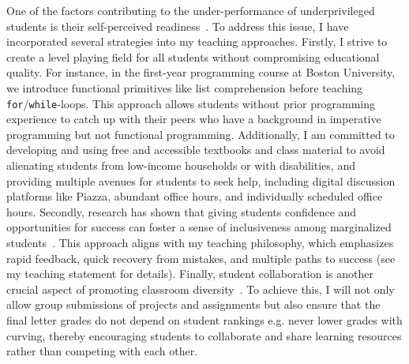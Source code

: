 \documentclass[11pt,a4paper,sans]{moderncv}
\begin{document}
One of the factors contributing to the under-performance of underprivileged students is their self-perceived readiness~\cite{kargarmoakhar_UnderstandingExperiencesThat_2020a,cassidy_DevelopingComputerUser_2002,vekiri_GenderIssuesTechnology_2008}. 
To address this issue, I have incorporated several strategies into my teaching approaches. 
Firstly, I strive to create a level playing field for all students without compromising educational quality. 
For instance, in the first-year programming course at Boston University, we introduce functional primitives like list comprehension before teaching \verb|for|/\verb|while|-loops.
This approach allows students without prior programming experience to catch up with their peers who have a background in imperative programming but not functional programming. 
Additionally, I am committed to developing and using free and accessible textbooks and class material to avoid alienating students from low-income households or with disabilities, and providing multiple avenues for students to seek help, including digital discussion platforms like Piazza, abundant office hours, and individually scheduled office hours.  
Secondly, research has shown that giving students confidence and opportunities for success can foster a sense of inclusiveness among marginalized students~\cite{kargarmoakhar_UnderstandingExperiencesThat_2020a}. 
This approach aligns with my teaching philosophy, which emphasizes rapid feedback, quick recovery from mistakes, and multiple paths to success (see my teaching statement for details). 
Finally, student collaboration is another crucial aspect of promoting classroom diversity~\cite{brinkman_ApplyingCommunalGoal_2016}. 
To achieve this, I will not only allow group submissions of projects and assignments but also ensure that the final letter grades do not depend on student rankings e.g. never lower grades with curving, thereby encouraging students to collaborate and share learning resources rather than competing with each other.
\end{document}

